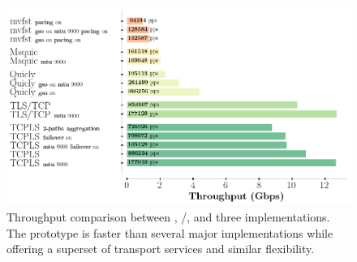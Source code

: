 \begin{figure}[!t]
  \begin{center}
    \includegraphics[width=\columnwidth]{figures/perf_analysis.png}
  \end{center}
  \caption{Throughput comparison between \tcpls, \tcp/\tls, and three \quic
  implementations.
    The \tcpls prototype is faster than several major \quic implementations while offering a superset of transport services and similar flexibility.}
  \label{fig:perf}
\end{figure}



